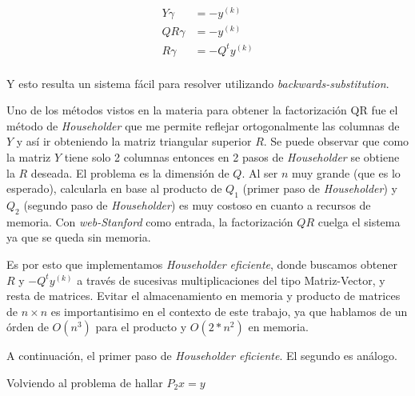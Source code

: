 \begin{align*}
	Y\gamma &=-y^{(k)}\\
	QR\gamma &=-y^{(k)}\\
	R\gamma &=-Q^{t}y^{(k)}\\
\end{align*}

Y esto resulta un sistema f\'acil para resolver utilizando \emph{backwards-substitution}.

Uno de los m\'etodos vistos en la materia para obtener la factorizaci\'on QR fue el m\'etodo de \emph{Householder} que me permite reflejar ortogonalmente las columnas de $Y$ y as\'i ir obteniendo la matriz triangular superior $R$. Se puede observar que como la matriz $Y$ tiene solo 2 columnas entonces en 2 pasos de \emph{Householder} se obtiene la $R$ deseada. El problema es la dimensi\'on de $Q$. Al ser $n$ muy grande (que es lo esperado), calcularla en base al producto de $Q_1$ (primer paso de \emph{Householder}) y $Q_2$ (segundo paso de \emph{Householder}) es muy costoso en cuanto a recursos de memoria. Con \emph{web-Stanford} como entrada, la factorizaci\'on $QR$ cuelga el sistema ya que se queda sin memoria. 

Es por esto que implementamos \emph{Householder eficiente}, donde buscamos obtener $R$ y $-Q^{t}y^{(k)}$ a trav\'es de sucesivas multiplicaciones del tipo Matriz-Vector, y resta de matrices. Evitar el almacenamiento en memoria y producto de matrices de $n \times n$ es importantisimo en el contexto de este trabajo, ya que hablamos de un \'orden de $O(n^3)$ para el producto y $O(2*n^2)$ en memoria.

A continuaci\'on, el primer paso de \emph{Householder eficiente}. El segundo es an\'alogo.



Volviendo al problema de hallar $P_{2}x = y$ 
